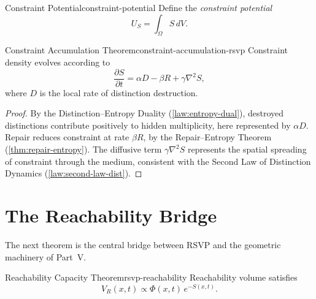 \documentclass[12pt,twoside,openright]{book}
\begin{document}
\begin{definition}{Constraint Potential}{constraint-potential}
  Define the \emph{constraint potential}
  \[
    U_S = \int_\Omega S \, dV.
  \]
\end{definition}

\begin{theorem}{Constraint Accumulation Theorem}{constraint-accumulation-rsvp}
  Constraint density evolves according to
  \[
    \frac{\partial S}{\partial t}
    = \alpha D - \beta R + \gamma \nabla^2 S,
  \]
  where $D$ is the local rate of distinction destruction.
\end{theorem}

\begin{proof}
  By the Distinction--Entropy Duality
  (\cref{law:entropy-dual}), destroyed distinctions
  contribute positively to hidden multiplicity, here
  represented by $\alpha D$. Repair reduces constraint at
  rate $\beta R$, by the Repair--Entropy Theorem
  (\cref{thm:repair-entropy}). The diffusive term
  $\gamma\nabla^2 S$ represents the spatial spreading of
  constraint through the medium, consistent with the
  Second Law of Distinction Dynamics
  (\cref{law:second-law-dist}).
\end{proof}

\section{The Reachability Bridge}
\label{sec:ch16-bridge}

The next theorem is the central bridge between RSVP and the
geometric machinery of Part~V.

\begin{theorem}{Reachability Capacity Theorem}{rsvp-reachability}
  Reachability volume satisfies
  \[
    V_R(x,t) \propto \Phi(x,t)\, e^{-S(x,t)}.
  \]
\end{theorem}
\end{document}
